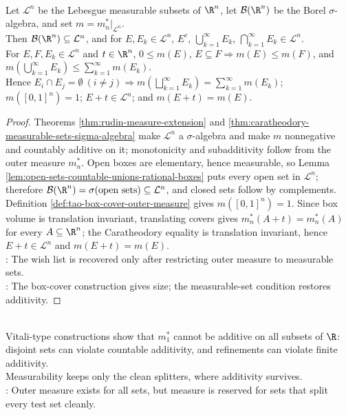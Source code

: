 \begin{theorem} \label{thm:lebesgue-measure-basic-properties-checklist} \\
Let $\mathcal{L}^n$ be the Lebesgue measurable subsets of $\R^n$, let $\mathcal{B}(\R^n)$ be the Borel $\sigma$-algebra, and set $m=m_n^\ast|_{\mathcal{L}^n}$.\\
Then $\mathcal{B}(\R^n)\subseteq\mathcal{L}^n$, and for $E,E_k\in\mathcal{L}^n$, $E^c$, $\bigcup\limits_{k=1}^{\infty}E_k$, $\bigcap\limits_{k=1}^{\infty}E_k\in\mathcal{L}^n$.\\
For $E,F,E_k\in\mathcal{L}^n$ and $t\in\R^n$, $0\leq m(E)$, $E\subseteq F\Longrightarrow m(E)\leq m(F)$, and $m\!\left(\bigcup_{k=1}^{\infty}E_k\right)\leq\sum\limits_{k=1}^{\infty}m(E_k)$.\\
Hence  $E_i\cap E_j=\emptyset\ (i\neq j)\Longrightarrow m\!\left(\bigsqcup\limits_{k=1}^{\infty}E_k\right)=\sum\limits_{k=1}^{\infty}m(E_k)$; $m([0,1]^n)=1$; $E+t\in\mathcal{L}^n$; and $m(E+t)=m(E)$.
\begin{proof}
Theorems \ref{thm:rudin-measure-extension} and \ref{thm:caratheodory-measurable-sets-sigma-algebra} make $\mathcal{L}^n$ a $\sigma$-algebra and make $m$ nonnegative and countably additive on it; monotonicity and subadditivity follow from the outer measure $m_n^\ast$. Open boxes are elementary, hence measurable, so Lemma \ref{lem:open-sets-countable-unions-rational-boxes} puts every open set in $\mathcal{L}^n$; therefore $\mathcal{B}(\R^n)=\sigma(\text{open sets})\subseteq\mathcal{L}^n$, and closed sets follow by complements. Definition \ref{def:tao-box-cover-outer-measure} gives $m([0,1]^n)=1$. Since box volume is translation invariant, translating covers gives $m_n^\ast(A+t)=m_n^\ast(A)$ for every $A\subseteq\R^n$; the Caratheodory equality is translation invariant, hence $E+t\in\mathcal{L}^n$ and $m(E+t)=m(E)$.\\
: The wish list is recovered only after restricting outer measure to measurable sets.\\
: The box-cover construction gives size; the measurable-set condition restores additivity.
\end{proof}
\end{theorem}

\begin{perspective} \label{per:outer-measure-not-enough} \\
Vitali-type constructions show that $m_1^\ast$ cannot be additive on all subsets of $\R$: disjoint sets can violate countable additivity, and refinements can violate finite additivity.\\
Measurability keeps only the clean splitters, where additivity survives.\\
: Outer measure exists for all sets, but measure is reserved for sets that split every test set cleanly.
\end{perspective}


